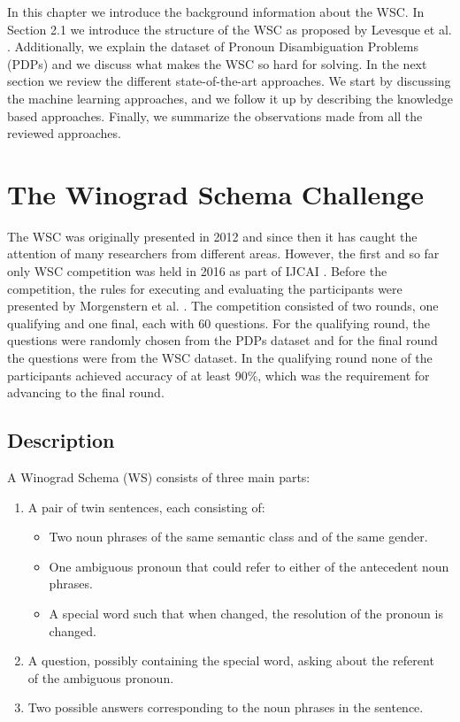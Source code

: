 \label{Background}
In this chapter we introduce the background information about the WSC. In Section 2.1 we introduce the structure of the WSC as proposed by Levesque et al. \cite{DBLP:conf/kr/LevesqueDM12}.
Additionally, we explain the dataset of Pronoun Disambiguation Problems (PDPs) and we discuss what makes the WSC so hard for solving. In the next section we review the different state-of-the-art approaches. We start by discussing the machine learning approaches, and we follow it up by describing the knowledge based approaches. Finally, we summarize the observations made from all the reviewed approaches.


\section{The Winograd Schema Challenge}
\label{section:TheWinogradSchemaChallenge}

The WSC was originally presented in 2012 \cite{DBLP:conf/kr/LevesqueDM12} and since then it has caught the  attention of many researchers from different areas. However, the first and so far only WSC competition was held in 2016 as part of IJCAI \cite{ijcai}. Before the competition, the rules for executing and evaluating the participants were presented by Morgenstern et al. \cite{DBLP:journals/aim/MorgensternDO16}. The competition consisted of two rounds, one qualifying and one final, each with 60 questions. For the qualifying round, the questions were randomly chosen from the PDPs dataset and for the final round the questions were from the WSC dataset. In the qualifying round none of the participants achieved accuracy of at least 90\%, which was the requirement for advancing to the final round.

\subsection{Description}
A Winograd Schema (WS) consists of three main parts:

\begin{enumerate}
	\item A pair of twin sentences, each consisting of:
	\begin{itemize}
		\item Two noun phrases of the same semantic class and of the same gender.
		\item One ambiguous pronoun that could refer to either of the antecedent noun phrases.
		\item A special word such that when changed, the resolution of the pronoun is changed.
	\end{itemize}
    \item A question, possibly containing the special word, asking about the referent \\of the ambiguous pronoun.
    \item Two possible answers corresponding to the noun phrases in the sentence.
\end{enumerate}

